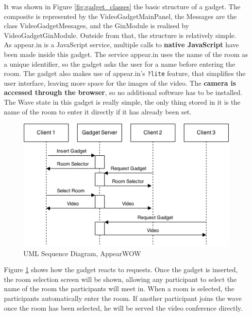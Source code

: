 It was shown in Figure \ref{fig:gadget_classes} the basic structure of a gadget. The composite is represented by the VideoGadgetMainPanel, the Messages are the class VideoGadgetMessages, and the GinModule is realised by VideoGadgetGinModule. Outside from that, the structure is relatively simple.\\[.2cm]
As appear.in is a JavaScript service, multiple calls to \textbf{native JavaScript} have been made inside this gadget.
The service appear.in uses the name of the room as a unique identifier, so the gadget asks the user for a name before entering the room. The gadget also makes use of appear.in's \verb|?lite| feature, that simplifies the user interface, leaving more space for the images of the video. The \textbf{camera is accessed through the browser}, so no additional software has to be installed.\\[.2cm]
The Wave state in this gadget is really simple, the only thing stored in it is the name of the room to enter it directly if it has already been set.\\[.2cm]
\begin{figure}[h]
  \center
    \includegraphics[keepaspectratio, scale=0.6]{Media/Diagrams/Gadget/VideoSequence.png}
  \caption{UML Sequence Diagram, AppearWOW}
  \label{fig:video_gadget_sequence}
\end{figure}
Figure \ref{fig:video_gadget_sequence} shows how the gadget reacts to requests. Once the gadget is inserted, the room selection screen will be shown, allowing any participant to select the name of the room the participants will meet in. When a room is selected, the participants automatically enter the room. If another participant joins the wave once the room has been selected, he will be served the video conference directly.
